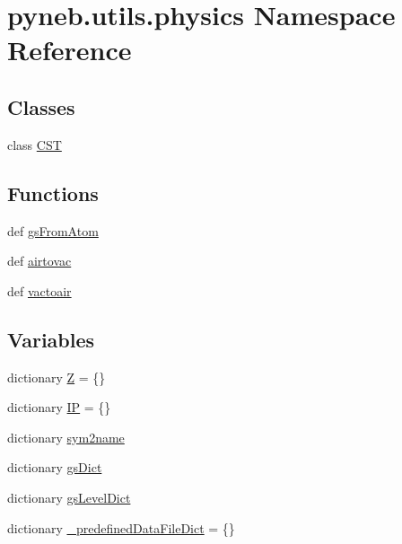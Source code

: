 \hypertarget{namespacepyneb_1_1utils_1_1physics}{\section{pyneb.\-utils.\-physics Namespace Reference}
\label{namespacepyneb_1_1utils_1_1physics}
}
\subsection*{Classes}
\begin{DoxyCompactItemize}
\item 
class \hyperlink{classpyneb_1_1utils_1_1physics_1_1_c_s_t}{C\-S\-T}
\end{DoxyCompactItemize}
\subsection*{Functions}
\begin{DoxyCompactItemize}
\item 
def \hyperlink{namespacepyneb_1_1utils_1_1physics_ad8bb8a1415a2efcc6512044ac8e883f8}{gs\-From\-Atom}
\item 
def \hyperlink{namespacepyneb_1_1utils_1_1physics_aa6c19471b62528a32df5b8c371e69057}{airtovac}
\item 
def \hyperlink{namespacepyneb_1_1utils_1_1physics_ae7f2ba7fc89983bb4d9fa50eb37f4b36}{vactoair}
\end{DoxyCompactItemize}
\subsection*{Variables}
\begin{DoxyCompactItemize}
\item 
dictionary \hyperlink{namespacepyneb_1_1utils_1_1physics_aa3d71513d5a031c2757981f1abd3197c}{Z} = \{\}
\item 
dictionary \hyperlink{namespacepyneb_1_1utils_1_1physics_a98382f08784fe7d142ec0758017c4117}{I\-P} = \{\}
\item 
dictionary \hyperlink{namespacepyneb_1_1utils_1_1physics_a9d07f39b9983e7918a815f905b0a6de1}{sym2name}
\item 
dictionary \hyperlink{namespacepyneb_1_1utils_1_1physics_ab143ee5cc76a192f8c1811837c142d19}{gs\-Dict}
\item 
dictionary \hyperlink{namespacepyneb_1_1utils_1_1physics_aab0d46710f5ecaa54ca513608a58299f}{gs\-Level\-Dict}
\item 
dictionary \hyperlink{namespacepyneb_1_1utils_1_1physics_a78612b3baa31d8b1afffc83fa7e63117}{\-\_\-predefined\-Data\-File\-Dict} = \{\}
\end{DoxyCompactItemize}


